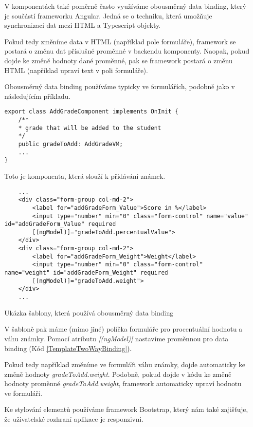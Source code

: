 V komponentách také poměrně často využíváme obousměrný data binding, který je součástí frameworku Angular. Jedná se o techniku, která umožňuje synchronizaci dat mezi HTML a Typescript objekty.

Pokud tedy změníme data v HTML (například pole formuláře), framework se postará o změnu dat příslušné proměnné v backendu komponenty. Naopak, pokud dojde ke změně hodnoty dané proměnné, pak se framework postará o změnu HTML (například upraví text v poli formuláře).

Obousměrný data binding používáme typicky ve formulářích, podobně jako v následujícím příkladu.

\lstset{style=typescript}
\begin{lstlisting}
export class AddGradeComponent implements OnInit {
	/**
	* grade that will be added to the student
	*/
	public gradeToAdd: AddGradeVM;
	...
}
\end{lstlisting}

Toto je komponenta, která slouží k přidávání známek. 

\lstset{style=html}
\begin{program}
	\begin{lstlisting}
	...
	<div class="form-group col-md-2">
		<label for="addGradeForm_Value">Score in %</label>
		<input type="number" min="0" class="form-control" name="value" id="addGradeForm_Value" required
		[(ngModel)]="gradeToAdd.percentualValue">
	</div>
	<div class="form-group col-md-2">
		<label for="addGradeForm_Weight">Weight</label>
		<input type="number" min="0" class="form-control" name="weight" id="addGradeForm_Weight" required
		[(ngModel)]="gradeToAdd.weight">
	</div>
	...
	\end{lstlisting}
	\caption{Ukázka šablony, která používá obousměrný data binding}
	\label{TemplateTwoWayBinding}
\end{program}

V šabloně pak máme (mimo jiné) políčka formuláře pro procentuální hodnotu a váhu známky.
Pomocí atributu \textit{[(ngModel)]} nastavíme proměnnou pro data binding (Kód \ref{TemplateTwoWayBinding}). 

Pokud tedy například změníme ve formuláři váhu známky, dojde automaticky ke změně hodnoty \textit{gradeToAdd.weight}. Podobně, pokud dojde v kódu ke změně hodnoty proměnné \textit{gradeToAdd.weight}, framework automaticky upraví hodnotu ve formuláři.

Ke stylování elementů používáme framework Bootstrap, který nám také zajišťuje, že uživatelské rozhraní aplikace je responzivní.

